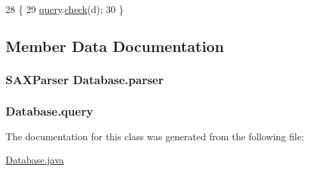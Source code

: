 \begin{DoxyCode}
28                                     \{
29         \hyperlink{classDatabase_ae6f7784250367e1154d766eb3192e38f}{query}.\hyperlink{interfaceQuery13_aa8625da54bbd25beb6968df65fe05e57}{check}(d);
30     \}
\end{DoxyCode}


\subsection{Member Data Documentation}
\subsubsection[{\texorpdfstring{parser}{parser}}]{\setlength{\rightskip}{0pt plus 5cm}S\+A\+X\+Parser Database.\+parser\hspace{0.3cm}{\ttfamily [private]}}\hypertarget{classDatabase_a484efd6d296ceb5ae434253519632980}{}\label{classDatabase_a484efd6d296ceb5ae434253519632980}
\subsubsection[{\texorpdfstring{query}{query}}]{ Database.\+query\hspace{0.3cm}{\ttfamily [private]}}\hypertarget{classDatabase_ae6f7784250367e1154d766eb3192e38f}{}\label{classDatabase_ae6f7784250367e1154d766eb3192e38f}


The documentation for this class was generated from the following file\+:\begin{DoxyCompactItemize}
\item 
\hyperlink{Database_8java}{Database.\+java}\end{DoxyCompactItemize}
